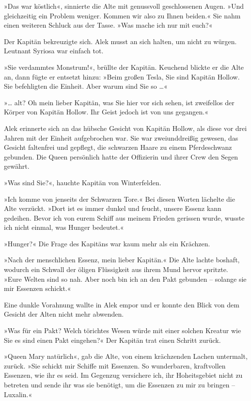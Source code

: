 »Das war köstlich«, sinnierte die Alte mit genussvoll geschlossenen
Augen. »Und gleichzeitig ein Problem weniger. Kommen wir also zu
Ihnen beiden.« Sie nahm einen weiteren Schluck aus der Tasse. »Was
mache ich nur mit euch?«

Der Kapitän bekreuzigte sich. Alek musst an sich halten, um nicht
zu würgen. Leutnant Syriosa war einfach tot.

»Sie verdammtes Monstrum!«, brüllte der Kapitän. Keuchend blickte
er die Alte an, dann fügte er entsetzt hinzu: »Beim großen Tesla,
Sie sind Kapitän Hollow. Sie befehligten die Einheit. Aber warum
sind Sie so \ldots{}«

»\ldots{} alt? Oh mein lieber Kapitän, was Sie hier vor sich sehen, ist
zweifellos der Körper von Kapitän Hollow. Ihr Geist jedoch ist von
uns gegangen.«

\bigpar

Alek erinnerte sich an das hübsche Gesicht von Kapitän Hollow, als
diese vor drei Jahren mit der Einheit aufgebrochen war. Sie war
zweiunddreißig gewesen, das Gesicht faltenfrei und gepflegt, die
schwarzen Haare zu einem Pferdeschwanz gebunden. Die Queen
persönlich hatte der Offizierin und ihrer Crew den Segen gewährt.

»Was sind Sie?«, hauchte Kapitän von Winterfelden.

»Ich komme von jenseits der Schwarzen Tore.« Bei diesen Worten
lächelte die Alte verzückt. »Dort ist es immer dunkel und feucht,
unsere Essenz kann gedeihen. Bevor ich von eurem Schiff aus meinem
Frieden gerissen wurde, wusste ich nicht einmal, was Hunger
bedeutet.«

»Hunger?« Die Frage des Kapitäns war kaum mehr als ein Krächzen.

»Nach der menschlichen Essenz, mein lieber Kapitän.« Die Alte
lachte boshaft, wodurch ein Schwall der öligen Flüssigkeit aus
ihrem Mund hervor spritzte. »Eure Welten sind so nah. Aber noch bin
ich an den Pakt gebunden – solange sie mir Essenzen schickt.«

\bigpar

Eine dunkle Vorahnung wallte in Alek empor und er konnte den Blick
von dem Gesicht der Alten nicht mehr abwenden.

»Was für ein Pakt? Welch törichtes Wesen würde mit einer solchen
Kreatur wie Sie es sind einen Pakt eingehen?« Der Kapitän trat
einen Schritt zurück.

»Queen Mary natürlich«, gab die Alte, von einem krächzenden Lachen
untermalt, zurück. »Sie schickt mir Schiffe mit Essenzen. So
wunderbaren, kraftvollen Essenzen, wie ihr es seid. Im Gegenzug
versichere ich, ihr Hoheitsgebiet nicht zu betreten und sende ihr
was sie benötigt, um die Essenzen zu mir zu bringen – Luxalin.«

